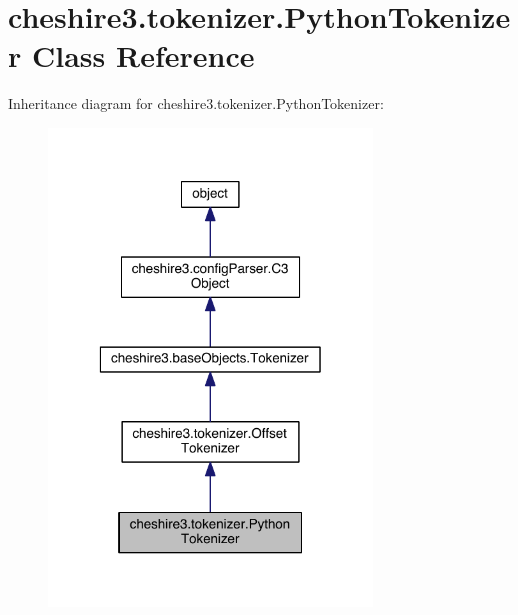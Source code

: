 \hypertarget{classcheshire3_1_1tokenizer_1_1_python_tokenizer}{\section{cheshire3.\-tokenizer.\-Python\-Tokenizer Class Reference}
\label{classcheshire3_1_1tokenizer_1_1_python_tokenizer}
}


Inheritance diagram for cheshire3.\-tokenizer.\-Python\-Tokenizer\-:
\nopagebreak
\begin{figure}[H]
\begin{center}
\leavevmode
\includegraphics[width=244pt]{classcheshire3_1_1tokenizer_1_1_python_tokenizer__inherit__graph}
\end{center}
\end{figure}


